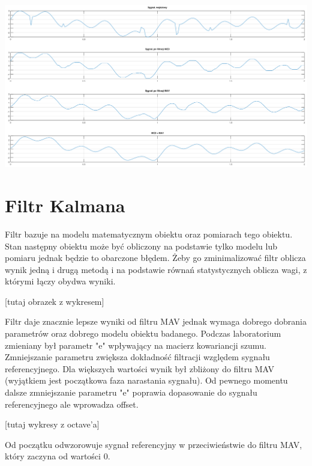 \documentclass[11pt]{article}
\begin{document}
\begin{center}
	\includegraphics[width=15cm]{med2.png}
\end{center}

\section{Filtr Kalmana}
Filtr bazuje na modelu matematycznym obiektu oraz pomiarach tego obiektu. Stan następny obiektu może być obliczony na podstawie tylko modelu lub pomiaru jednak będzie to obarczone błędem. Żeby go zminimalizować filtr oblicza wynik jedną i drugą metodą i na podstawie równań statystycznych oblicza wagi, z którymi łączy obydwa wyniki.

[tutaj obrazek z wykresem]

Filtr daje  znacznie lepsze wyniki od filtru MAV jednak wymaga dobrego dobrania parametrów oraz dobrego modelu obiektu badanego. Podczas laboratorium zmieniany był parametr "e" wpływający na macierz kowariancji szumu. Zmniejszanie parametru zwiększa dokładność filtracji względem sygnału referencyjnego. Dla większych wartości wynik był zbliżony do filtru MAV (wyjątkiem jest początkowa faza narastania sygnału). Od pewnego momentu dalsze zmniejszanie parametru "e" poprawia dopasowanie do sygnału referencyjnego ale wprowadza offset.

[tutaj wykresy z octave'a]

Od początku odwzorowuje sygnał referencyjny w przeciwieństwie do filtru MAV, który zaczyna od wartości 0.
\end{document}
